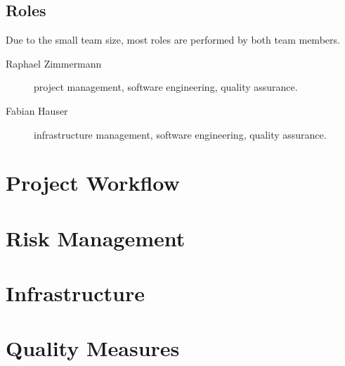 \documentclass[a4paper]{article}
\begin{document}
\subsection{Roles}

Due to the small team size, most roles are performed by both team members.

\begin{description}
	\item[Raphael Zimmermann] project management, software engineering, quality assurance.
	\item[Fabian Hauser] infrastructure management, software engineering, quality assurance.
\end{description}

\section{Project Workflow}


\section{Risk Management}

\section{Infrastructure}

\section{Quality Measures}



\end{document}

